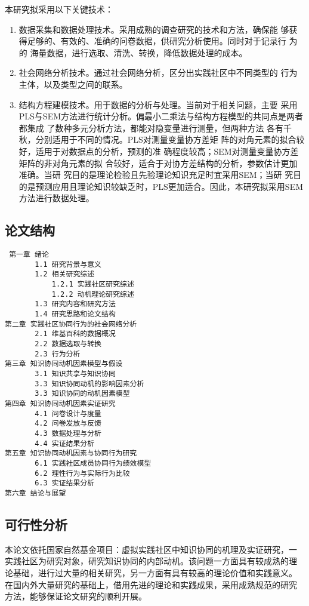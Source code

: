 \documentclass[12pt,a4paper,cs4size]{ctexart}
\begin{document}
本研究拟采用以下关键技术：
\begin{enumerate}
\item  数据采集和数据处理技术。采用成熟的调查研究的技术和方法，确保能
  够获得足够的、有效的、准确的问卷数据，供研究分析使用。同时对于记录行
  为的
  海量数据，进行选取、清洗、转换，降低数据处理的成本。
\item  社会网络分析技术。通过社会网络分析，区分出实践社区中不同类型的
  行为主体，以及类型之间的联系。
\item  结构方程建模技术。用于数据的分析与处理。当前对于相关问题，主要
  采用PLS与SEM方法进行统计分析。偏最小二乘法与结构方程模型的共同点是两者都集成
了数种多元分析方法，都能对隐变量进行测量，但两种方法
各有千秋，分别适用于不同的情况。PLS对测量变量协方差矩
阵的对角元素的拟合较好，适用于对数据点的分析，预测的准
确程度较高；SEM对测量变量协方差矩阵的非对角元素的拟
合较好，适合于对协方差结构的分析，参数估计更加准确。当研
究目的是理论检验且先验理论知识充足时宜采用SEM；当研
究目的是预测应用且理论知识较缺乏时，PLS更加适合。因此，本研究拟采用SEM
方法进行数据处理。

\end{enumerate}

\subsection{论文结构}

\begin{verbatim}
 第一章 绪论
       1.1 研究背景与意义
       1.2 相关研究综述
           1.2.1 实践社区研究综述
           1.2.2 动机理论研究综述
       1.3 研究内容和研究方法
       1.4 研究思路和论文结构
第二章 实践社区协同行为的社会网络分析
       2.1 维基百科的数据概况
       2.2 数据选取与转换
       2.3 行为分析
第三章 知识协同动机因素模型与假设
       3.1 知识共享与知识协同
       3.3 知识协同动机的影响因素分析
       3.3 知识协同的动机因素模型
第四章 知识协同动机因素实证研究
       4.1 问卷设计与度量
       4.2 问卷发放与反馈
       4.3 数据处理与分析
       4.4 实证结果分析
第五章 知识协同动机因素与协同行为研究
       6.1 实践社区成员协同行为绩效模型
       6.2 理性行为与实际行为比较
       6.3 实证结果分析
第六章 结论与展望
\end{verbatim}
\subsection{可行性分析}
本论文依托国家自然基金项目：虚拟实践社区中知识协同的机理及实证研究，一
实践社区为研究对象，研究知识协同的内部动机。该问题一方面具有较成熟的理
论基础，进行过大量的相关研究，另一方面有具有较高的理论价值和实践意义。
在国内外大量研究的基础上，借用先进的理论和实践成果，采用成熟规范的研究
方法，能够保证论文研究的顺利开展。
\end{document}
